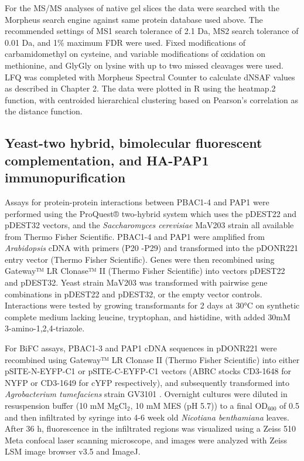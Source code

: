 For the MS/MS analyses of native gel slices the data were searched with the Morpheus search engine \citep{wenger13} against same protein database used above. The recommended settings of MS1 search tolerance of 2.1 Da, MS2 search tolerance of 0.01 Da, and 1\% maximum FDR were used.  Fixed modifications of carbamidomethyl on cysteine, and variable modifications of oxidation on methionine, and GlyGly on lysine with up to two missed cleavages were used. LFQ was completed with Morpheus Spectral Counter \citep{gemperline16} to calculate dNSAF values as described in Chapter 2. The data were plotted in R using the heatmap.2 function, with centroided hierarchical clustering based on Pearson's correlation as the distance function.
\subsection{Yeast-two hybrid, bimolecular fluorescent complementation, and HA-PAP1 immunopurification}
	Assays for protein-protein interactions between PBAC1-4 and PAP1 were performed using the ProQuest® two-hybrid system which uses the pDEST22 and pDEST32 vectors, and the \textit{Saccharomyces cerevisiae} MaV203 strain \citep{vidal96} all available from Thermo Fisher Scientific. PBAC1-4 and PAP1 were amplified from \textit{Arabidopsis} cDNA with primers (P20 -P29) and transformed into the pDONR221 entry vector (Thermo Fisher Scientific). Genes were then recombined using Gateway™ LR Clonase™ II (Thermo Fisher Scientific) into vectors pDEST22 and pDEST32. Yeast strain MaV203 was transformed with pairwise gene combinations in pDEST22 and pDEST32, or the empty vector controls. Interactions were tested by growing transformants for 2 days at 30°C on synthetic complete medium lacking leucine, tryptophan, and histidine, with added 30mM 3-amino-1,2,4-triazole.
	
	For BiFC assays, PBAC1-3 and PAP1 cDNA sequences in pDONR221 were recombined using Gateway™  LR Clonase II (Thermo Fisher Scientific) into either pSITE-N-EYFP-C1 or pSITE-C-EYFP-C1 vectors \citep{martin09} (ABRC stocks CD3-1648 for NYFP or CD3-1649 for cYFP respectively), and subsequently transformed into \textit{Agrobacterium tumefaciens} strain GV3101 \citep{gelvin03}. Overnight cultures were diluted in resuspension buffer (10 mM MgCl$_{2}$, 10 mM MES (pH 5.7)) to a final OD$_{600}$ of 0.5 and then infiltrated by syringe into 4-6 week old \textit{Nicotiana benthamiana} leaves. After 36 h, fluorescence in the infiltrated regions was visualized using a Zeiss 510 Meta confocal laser scanning microscope, and images were analyzed with Zeiss LSM image browser v3.5 and ImageJ.
	
